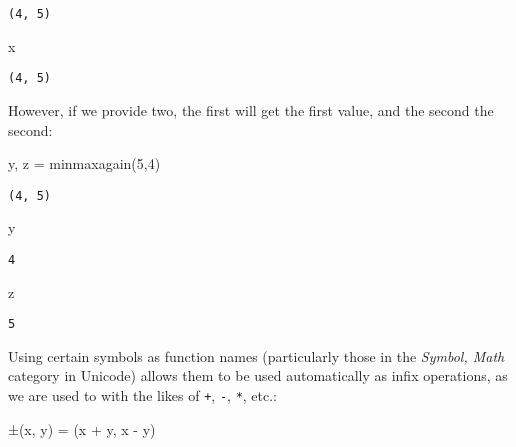 \documentclass[
  letterpaper,
  DIV=11,
  numbers=noendperiod]{scrreprt}
\newenvironment{Shaded}{\begin{snugshade}}{\end{snugshade}}
\newcommand{\FloatTok}[1]{\textcolor[rgb]{0.68,0.00,0.00}{#1}}
\newcommand{\FunctionTok}[1]{\textcolor[rgb]{0.28,0.35,0.67}{#1}}
\newcommand{\NormalTok}[1]{\textcolor[rgb]{0.00,0.23,0.31}{#1}}
\newcommand{\OperatorTok}[1]{\textcolor[rgb]{0.37,0.37,0.37}{#1}}
\begin{document}
\begin{verbatim}
(4, 5)
\end{verbatim}

\begin{Shaded}
\begin{Highlighting}[]
\NormalTok{x}
\end{Highlighting}
\end{Shaded}

\begin{verbatim}
(4, 5)
\end{verbatim}

However, if we provide two, the first will get the first value, and the
second the second:

\begin{Shaded}
\begin{Highlighting}[]
\NormalTok{y, z }\OperatorTok{=} \FunctionTok{minmaxagain}\NormalTok{(}\FloatTok{5}\NormalTok{,}\FloatTok{4}\NormalTok{)}
\end{Highlighting}
\end{Shaded}

\begin{verbatim}
(4, 5)
\end{verbatim}

\begin{Shaded}
\begin{Highlighting}[]
\NormalTok{y}
\end{Highlighting}
\end{Shaded}

\begin{verbatim}
4
\end{verbatim}

\begin{Shaded}
\begin{Highlighting}[]
\NormalTok{z}
\end{Highlighting}
\end{Shaded}

\begin{verbatim}
5
\end{verbatim}

Using certain symbols as function names (particularly those in the
\emph{Symbol, Math} category in Unicode) allows them to be used
automatically as infix operations, as we are used to with the likes of
\texttt{+}, \texttt{-}, \texttt{*}, etc.:

\begin{Shaded}
\begin{Highlighting}[]
\FunctionTok{±}\NormalTok{(x, y) }\OperatorTok{=}\NormalTok{ (x }\OperatorTok{+}\NormalTok{ y, x }\OperatorTok{{-}}\NormalTok{ y)}
\end{Highlighting}
\end{Shaded}
\end{document}
